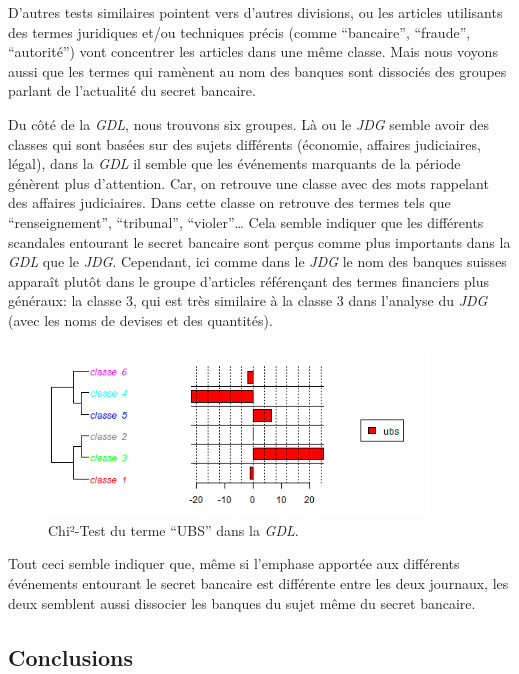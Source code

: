 \documentclass[11pt]{article}
\begin{document}
D'autres tests similaires pointent vers d'autres divisions, ou les
articles utilisants des termes juridiques et/ou techniques précis (comme
``bancaire'', ``fraude'', ``autorité'') vont concentrer les articles
dans une même classe. Mais nous voyons aussi que les termes qui ramènent
au nom des banques sont dissociés des groupes parlant de l'actualité du
secret bancaire.

Du côté de la \emph{GDL}, nous trouvons six groupes. Là ou le \emph{JDG}
semble avoir des classes qui sont basées sur des sujets différents
(économie, affaires judiciaires, légal), dans la \emph{GDL} il semble
que les événements marquants de la période génèrent plus d'attention.
Car, on retrouve une classe avec des mots rappelant des affaires
judiciaires. Dans cette classe on retrouve des termes tels que
``renseignement'', ``tribunal'', ``violer''\ldots{} Cela semble indiquer
que les différents scandales entourant le secret bancaire sont perçus
comme plus importants dans la \emph{GDL} que le \emph{JDG}. Cependant,
ici comme dans le \emph{JDG} le nom des banques suisses apparaît plutôt
dans le groupe d'articles référençant des termes financiers plus
généraux: la classe 3, qui est très similaire à la classe 3 dans
l'analyse du \emph{JDG} (avec les noms de devises et des quantités).

\begin{figure}
\centering
\includegraphics[width=0.9\textwidth ]{analysis/ubs_chisquare_gdl.png}
\caption{Chi²-Test du terme ``UBS'' dans la \emph{GDL}.}
\end{figure}

Tout ceci semble indiquer que, même si l'emphase apportée aux différents
événements entourant le secret bancaire est différente entre les deux
journaux, les deux semblent aussi dissocier les banques du sujet même du
secret bancaire.

\hypertarget{conclusions}{%
\subsection{Conclusions}\label{conclusions}}
\end{document}

